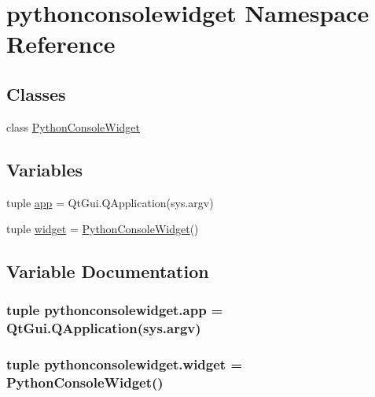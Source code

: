 \hypertarget{namespacepythonconsolewidget}{}\section{pythonconsolewidget Namespace Reference}
\label{namespacepythonconsolewidget}
\subsection*{Classes}
\begin{DoxyCompactItemize}
\item 
class \hyperlink{classpythonconsolewidget_1_1PythonConsoleWidget}{Python\+Console\+Widget}
\end{DoxyCompactItemize}
\subsection*{Variables}
\begin{DoxyCompactItemize}
\item 
tuple \hyperlink{namespacepythonconsolewidget_aa4f0449e2aa5870dc5bc5c9c0da48326}{app} = Qt\+Gui.\+Q\+Application(sys.\+argv)
\item 
tuple \hyperlink{namespacepythonconsolewidget_a6fdccd675adf4e01ccb79c89ab820242}{widget} = \hyperlink{classpythonconsolewidget_1_1PythonConsoleWidget}{Python\+Console\+Widget}()
\end{DoxyCompactItemize}


\subsection{Variable Documentation}
\hypertarget{namespacepythonconsolewidget_aa4f0449e2aa5870dc5bc5c9c0da48326}{}
\subsubsection[{app}]{\setlength{\rightskip}{0pt plus 5cm}tuple pythonconsolewidget.\+app = Qt\+Gui.\+Q\+Application(sys.\+argv)}\label{namespacepythonconsolewidget_aa4f0449e2aa5870dc5bc5c9c0da48326}
\hypertarget{namespacepythonconsolewidget_a6fdccd675adf4e01ccb79c89ab820242}{}
\subsubsection[{widget}]{\setlength{\rightskip}{0pt plus 5cm}tuple pythonconsolewidget.\+widget = {\bf Python\+Console\+Widget}()}\label{namespacepythonconsolewidget_a6fdccd675adf4e01ccb79c89ab820242}

